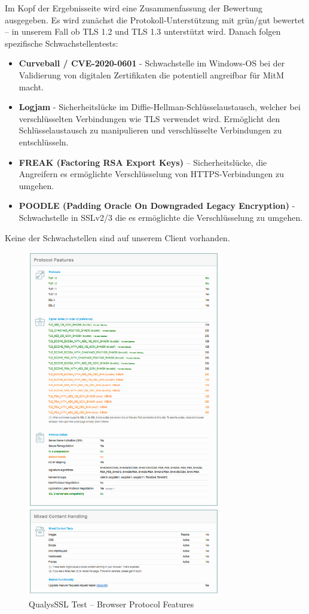 \documentclass{article}
\begin{document}
Im Kopf der Ergebnisseite wird eine Zusammenfassung der Bewertung ausgegeben. Es wird zunächst 
die Protokoll-Unterstützung mit grün/gut bewertet – in unserem Fall ob TLS 1.2 und TLS 1.3 unterstützt wird.
Danach folgen spezifische Schwachstellentests:

\begin{itemize}
    \item \textbf{Curveball / CVE-2020-0601} - Schwachstelle im Windows-OS bei der
    	Validierung von digitalen Zertifikaten die potentiell angreifbar für MitM macht.
    \item \textbf{Logjam} - Sicherheitslücke im Diffie-Hellman-Schlüsselaustausch,
		welcher bei verschlüsselten Verbindungen wie TLS verwendet wird. Ermöglicht den Schlüsselaustausch
		zu manipulieren und verschlüsselte Verbindungen zu entschlüsseln.
    \item \textbf{FREAK (Factoring RSA Export Keys)} – Sicherheitslücke, die Angreifern
		es ermöglichte Verschlüsselung von HTTPS-Verbindungen zu umgehen.
    \item \textbf{POODLE (Padding Oracle On Downgraded Legacy Encryption)} - Schwachstelle
		in SSLv2/3 die es ermöglichte die Verschlüsselung zu umgehen.
\end{itemize}

Keine der Schwachstellen sind auf unserem Client vorhanden.

\begin{figure}[H]
	\includegraphics[width=0.75\textwidth]{images/04}
	\centering
	\caption{QualysSSL Test – Browser Protocol Features}
\end{figure}
\end{document}
